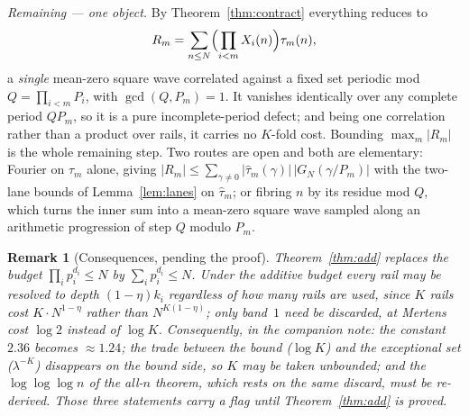 \documentclass[11pt]{article}
\newtheorem{remark}[theorem]{Remark}
\begin{document}
\emph{Remaining --- one object.}  By Theorem~\ref{thm:contract} everything reduces to
\[
R_m=\sum_{n\le N}\Bigl(\prod_{i<m}X_i(n)\Bigr)\tau_m(n),
\]
a \emph{single} mean-zero square wave correlated against a fixed set periodic mod
$Q=\prod_{i<m}P_i$, with $\gcd(Q,P_m)=1$.  It vanishes identically over any complete
period $QP_m$, so it is a pure incomplete-period defect; and being one correlation
rather than a product over rails, it carries no $K$-fold cost.  Bounding
$\max_m|R_m|$ is the whole remaining step.  Two routes are open and both are
elementary: Fourier on $\tau_m$ alone, giving
$|R_m|\le\sum_{\gamma\ne0}|\hat\tau_m(\gamma)|\,|G_N(\gamma/P_m)|$ with the two-lane
bounds of Lemma~\ref{lem:lanes} on $\hat\tau_m$; or fibring $n$ by its residue mod $Q$,
which turns the inner sum into a mean-zero square wave sampled along an arithmetic
progression of step $Q$ modulo $P_m$.

\begin{remark}[Consequences, pending the proof]
Theorem~\ref{thm:add} replaces the budget $\prod_ip_i^{d_i}\le N$ by
$\sum_ip_i^{d_i}\le N$.  Under the additive budget every rail may be resolved to depth
$(1-\eta)k_i$ regardless of how many rails are used, since $K$ rails cost $K\cdot N^{1-\eta}$
rather than $N^{K(1-\eta)}$; only band~$1$ need be discarded, at Mertens cost $\log2$
instead of $\log K$.  Consequently, in the companion note: the constant $2.36$ becomes
$\approx1.24$; the trade between the bound ($\log K$) and the exceptional set
($\lambda^{-K}$) disappears on the bound side, so $K$ may be taken unbounded; and the
$\log\log\log n$ of the all-$n$ theorem, which rests on the same discard, must be
re-derived.  Those three statements carry a flag until Theorem~\ref{thm:add} is proved.
\end{remark}
\end{document}
